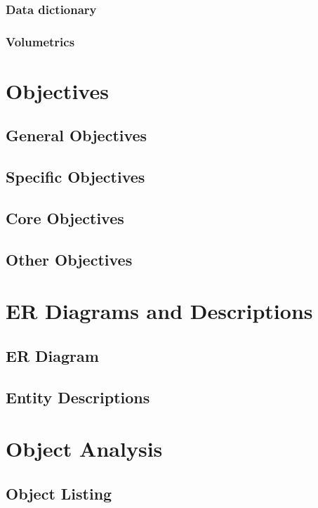 \subsubsection{Data dictionary}

\subsubsection{Volumetrics}

\section{Objectives}

\subsection{General Objectives}

\subsection{Specific Objectives}

\subsection{Core Objectives}

\subsection{Other Objectives}

\section{ER Diagrams and Descriptions}

\subsection{ER Diagram}

\subsection{Entity Descriptions}

\section{Object Analysis}

\subsection{Object Listing}

